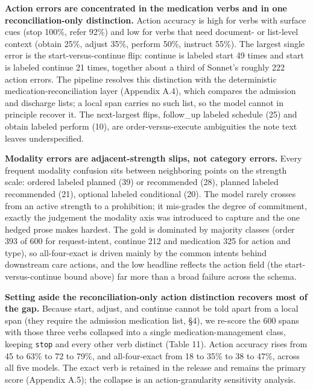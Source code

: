 \documentclass[3p,twocolumn]{elsarticle}
\begin{document}
\textbf{Action errors are concentrated in the medication verbs and in one reconciliation-only distinction.} Action accuracy is high for verbs with surface cues (stop 100\%, refer 92\%) and low for verbs that need document- or list-level context (obtain 25\%, adjust 35\%, perform 50\%, instruct 55\%). The largest single error is the start-versus-continue flip: continue is labeled start 49 times and start is labeled continue 21 times, together about a third of Sonnet's roughly 222 action errors. The pipeline resolves this distinction with the deterministic medication-reconciliation layer (Appendix A.4), which compares the admission and discharge lists; a local span carries no such list, so the model cannot in principle recover it. The next-largest flips, follow\_up labeled schedule (25) and obtain labeled perform (10), are order-versus-execute ambiguities the note text leaves underspecified.

\textbf{Modality errors are adjacent-strength slips, not category errors.} Every frequent modality confusion sits between neighboring points on the strength scale: ordered labeled planned (39) or recommended (28), planned labeled recommended (21), optional labeled conditional (20). The model rarely crosses from an active strength to a prohibition; it mis-grades the degree of commitment, exactly the judgement the modality axis was introduced to capture and the one hedged prose makes hardest. The gold is dominated by majority classes (order 393 of 600 for request-intent, continue 212 and medication 325 for action and type), so all-four-exact is driven mainly by the common intents behind downstream care actions, and the low headline reflects the action field (the start-versus-continue bound above) far more than a broad failure across the schema.

\textbf{Setting aside the reconciliation-only action distinction recovers most of the gap.} Because start, adjust, and continue cannot be told apart from a local span (they require the admission medication list, §4), we re-score the 600 spans with those three verbs collapsed into a single medication-management class, keeping \texttt{stop} and every other verb distinct (Table 11). Action accuracy rises from 45 to 63\% to 72 to 79\%, and all-four-exact from 18 to 35\% to 38 to 47\%, across all five models. The exact verb is retained in the release and remains the primary score (Appendix A.5); the collapse is an action-granularity sensitivity analysis.
\end{document}
